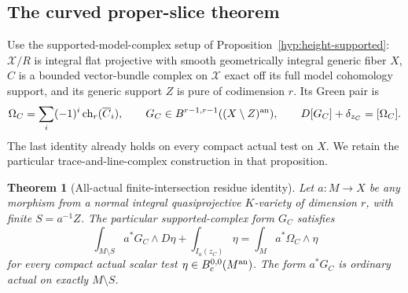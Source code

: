 \documentclass[11pt,a4paper]{article}
\newtheorem{theorem}{Theorem}[section]
\theoremstyle{definition}
\theoremstyle{remark}
\numberwithin{equation}{section}
\begin{document}
\subsection{The curved proper-slice theorem}

Use the supported-model-complex setup of Proposition~\ref{hyp:height-supported}:
$\mathcal X/R$ is integral flat projective with smooth geometrically
integral generic fiber $X$, $C$ is a bounded vector-bundle complex on
$\mathcal X$ exact off its full model cohomology support, and its generic
support $Z$ is pure of codimension $r$. Its Green pair is
\[
 \Omega_C=\sum_i(-1)^i\operatorname{ch}_r(\overline C_i),
 \qquad G_C\in B^{r-1,r-1}((X\setminus Z)^{\rm an}),
 \qquad D[G_C]+\delta_{z_C}=[\Omega_C].
\]
The last identity already holds on every compact actual test on $X$.
We retain the particular trace-and-line-complex construction in that proposition.

\begin{theorem}[All-actual finite-intersection residue identity]
\label{r16h:curved-slice}
Let $a:M\to X$ be any morphism from a normal integral quasiprojective
$K$-variety of dimension $r$, with finite $S=a^{-1}Z$. The particular
supported-complex form $G_C$ satisfies
\[
 \int_{M\setminus S}a^*G_C\wedge D\eta
       +\int_{I_a(z_C)}\eta
       =\int_M a^*\Omega_C\wedge\eta
 \tag{H16.4}\label{r16h:curved-slice-eq}
\]
for every compact actual scalar test $\eta\in B_c^{0,0}(M^{\rm an})$.
The form $a^*G_C$ is ordinary actual on exactly $M\setminus S$.
\end{theorem}
\end{document}
